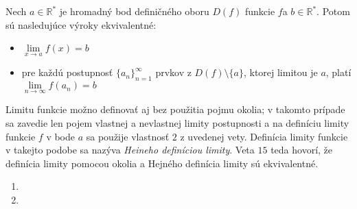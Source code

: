 \begin{veta}
Nech $a \in \mathbb{R^*}$ je hromadný bod definičného oboru $D(f)$ funkcie $f$a
$b \in \mathbb{R^*}$. Potom sú nasledujúce výroky ekvivalentné:
\begin{itemize}
\item $\lim\limits_{x \rightarrow a} f(x)=b$
\item pre každú postupnosť ${\{a_n\}}_{n=1}^\infty$ prvkov z $D(f)\setminus \{
a\}$, ktorej limitou je $a$, platí $\lim\limits_{n \rightarrow \infty} f(a_n)=b$
\end{itemize}
\end{veta}

Limitu funkcie možno definovať aj bez použitia pojmu okolia; v takomto prípade
sa zavedie len pojem vlastnej a nevlastnej limity postupnosti a na definíciu
limity funkcie $f$ v bode $a$ sa použije vlastnosť $2$ z uvedenej vety.
Definícia limity funkcie v takejto podobe sa nazýva \textit{Heineho definíciou
limity}. Veta $15$ teda hovorí, že definícia limity pomocou okolia a Hejného
definícia limity sú ekvivalentné.

\begin{enumerate}[resume]
  \item {}
  \item {}
\end{enumerate}